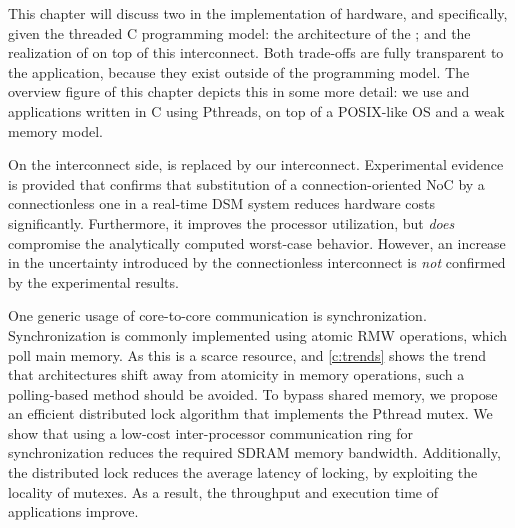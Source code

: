 This chapter will discuss two  in the implementation of  hardware, and \Starburst* specifically, given the threaded C programming model: the architecture of the ; and the realization of  on top of this interconnect.
Both trade-offs are fully transparent to the application, because they exist outside of the programming model.
The overview figure of this chapter \chapfigpageref depicts this in some more detail: we use \SPLASH and \PARSEC applications written in C using Pthreads, on top of a \ac{POSIX}-like \ac{OS} and a weak memory model.

On the interconnect side, \aethereal is replaced by our \Warpfield interconnect.
Experimental evidence is provided that confirms that substitution of a connection-oriented \ac{NoC} by a connectionless one in a real-time \ac{DSM} system reduces hardware costs significantly.
Furthermore, it improves the processor utilization, but \emph{does} compromise the analytically computed worst-case behavior.
However, an increase in the uncertainty introduced by the connectionless interconnect is \emph{not} confirmed by the experimental results.

One generic usage of core-to-core communication is synchronization.
Synchronization is commonly implemented using atomic \ac{RMW} operations, which poll main memory.
As this is a scarce resource, and \cref{c:trends} shows the trend that architectures shift away from atomicity in memory operations, such a polling-based method should be avoided.
To bypass shared memory, we propose an efficient distributed lock algorithm that implements the Pthread mutex.
We show that using a low-cost inter-processor communication ring for synchronization reduces the required \ac{SDRAM} memory bandwidth.
Additionally, the distributed lock reduces the average latency of locking, by exploiting the locality of mutexes.
As a result, the throughput and execution time of applications improve.



